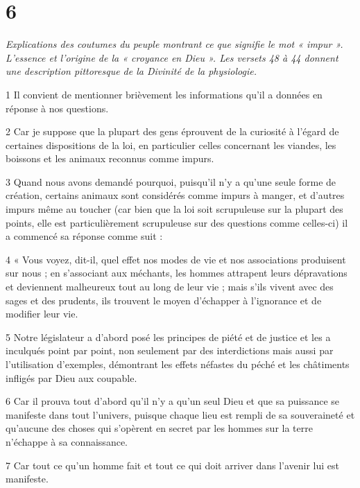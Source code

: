 \chapter{6}

\par \textit{Explications des coutumes du peuple montrant ce que signifie le mot « impur ». L’essence et l’origine de la « croyance en Dieu ». Les versets 48 à 44 donnent une description pittoresque de la Divinité de la physiologie.}

\par 1 Il convient de mentionner brièvement les informations qu'il a données en réponse à nos questions.

\par 2 Car je suppose que la plupart des gens éprouvent de la curiosité à l'égard de certaines dispositions de la loi, en particulier celles concernant les viandes, les boissons et les animaux reconnus comme impurs.

\par 3 Quand nous avons demandé pourquoi, puisqu'il n'y a qu'une seule forme de création, certains animaux sont considérés comme impurs à manger, et d'autres impurs même au toucher (car bien que la loi soit scrupuleuse sur la plupart des points, elle est particulièrement scrupuleuse sur des questions comme celles-ci) il a commencé sa réponse comme suit :

\par 4 « Vous voyez, dit-il, quel effet nos modes de vie et nos associations produisent sur nous ; en s'associant aux méchants, les hommes attrapent leurs dépravations et deviennent malheureux tout au long de leur vie ; mais s'ils vivent avec des sages et des prudents, ils trouvent le moyen d'échapper à l'ignorance et de modifier leur vie.

\par 5 Notre législateur a d'abord posé les principes de piété et de justice et les a inculqués point par point, non seulement par des interdictions mais aussi par l'utilisation d'exemples, démontrant les effets néfastes du péché et les châtiments infligés par Dieu aux coupable.

\par 6 Car il prouva tout d'abord qu'il n'y a qu'un seul Dieu et que sa puissance se manifeste dans tout l'univers, puisque chaque lieu est rempli de sa souveraineté et qu'aucune des choses qui s'opèrent en secret par les hommes sur la terre n'échappe à sa connaissance.

\par 7 Car tout ce qu'un homme fait et tout ce qui doit arriver dans l'avenir lui est manifeste.

